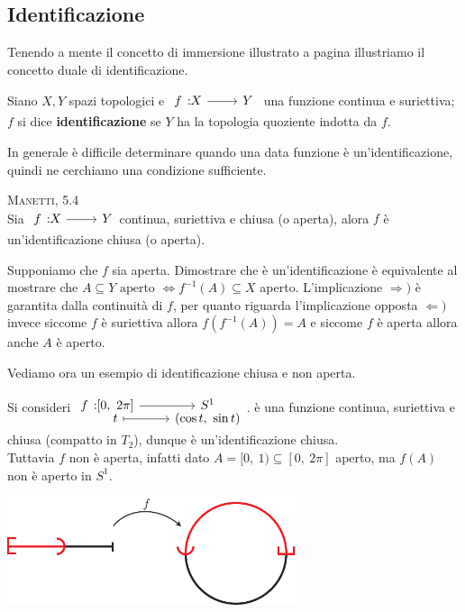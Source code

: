 	\subsection{Identificazione}
Tenendo a mente il concetto di immersione illustrato a pagina \pageref{immersione} illustriamo il concetto duale di identificazione.
\begin{define}
	Siano $X,Y$ spazi topologici e $\funz f X Y$ una funzione continua e suriettiva; $f$ si dice \textbf{identificazione} se $Y$ ha la topologia quoziente indotta da $f$.
\end{define}
In generale è difficile determinare quando una data funzione è un'identificazione, quindi ne cerchiamo una condizione sufficiente. 
\begin{theorema} \textsc{Manetti, 5.4} \label{condizione sufficiente identificazione}\\
	Sia $\funz f X Y$continua, suriettiva e chiusa (o aperta), alora $f$ è un'identificazione chiusa (o aperta).
\end{theorema}
\begin{demonstration}
	Supponiamo che $f$ sia aperta. Dimostrare che è un'identificazione è equivalente al mostrare che $\displaystyle A\subseteq Y \text{ aperto } \iff f^{-1}(A)\subseteq X$ aperto. L'implicazione $\Rightarrow)$ è garantita dalla continuità di $f$, per quanto riguarda l'implicazione opposta $\Leftarrow)$ invece siccome $f$ è suriettiva allora $f(f^{-1}(A))=A$ e siccome $f$ è aperta allora anche $A$ è aperto.
\end{demonstration}

Vediamo ora un esempio di identificazione chiusa e non aperta.
\begin{example}
	Si consideri $\displaystyle \funztot f {[0, \ 2\pi]} {S^1} t {(\cos t, \ \sin t)}$. è una funzione continua, suriettiva e chiusa (compatto in $T_2$), dunque è un'identificazione chiusa. \\
	Tuttavia $f$ non è aperta, infatti dato $A=[0, \ 1)\subseteq [0, \ 2\pi]$ aperto, ma $f(A)$ non è aperto in $S^1$.
		\begin{center}
			\includegraphics[width=240pt]{images/half_circle-eps-converted-to.pdf}
		\end{center}
\end{example}

